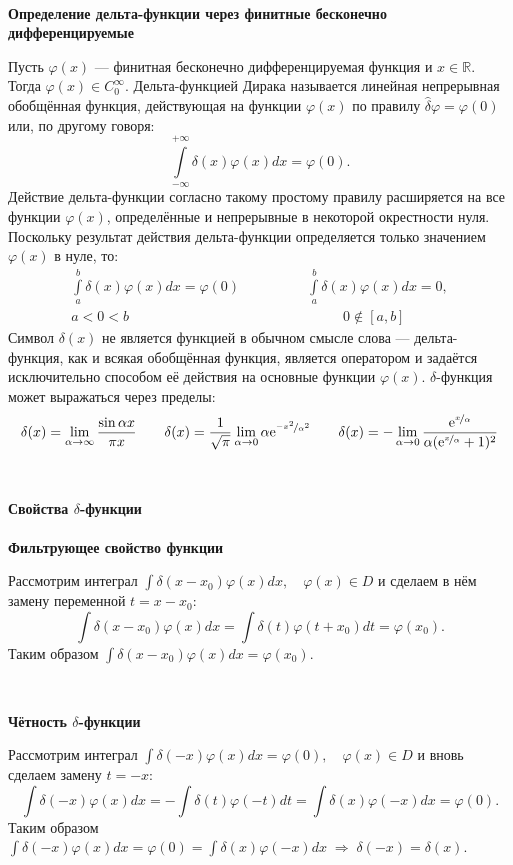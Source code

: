 \documentclass[russian,12pt]{article}
\providecommand{\subheader}[1]{
    \,
    \begin{center}
        {\large \textbf{#1}}
    \end{center}
    }
\providecommand{\headwithsub}[2]{
    \,
    \begin{center}
        {\Large \textbf{#1}} \\ \, \\
        {\large \textbf{#2}}
    \end{center}
    }
\begin{document}
\subheader{Определение дельта-функции через финитные бесконечно дифференцируемые}
Пусть $\varphi(x)$ --- финитная бесконечно дифференцируемая функция и $x \in \mathbb{R}$. Тогда $\varphi(x) \in C^{\infty}_0$. Дельта-функцией Дирака называется линейная непрерывная обобщённая функция, действующая на функции $\varphi(x)$ по правилу $\hat{\delta}\varphi = \varphi(0)$ или, по другому говоря:
$$\int\limits_{-\infty}^{+\infty}\delta(x)\varphi(x)dx = \varphi(0).$$
Действие дельта-функции согласно такому простому правилу расширяется на все функции $\varphi(x)$, определённые и непрерывные в некоторой окрестности нуля. Поскольку результат действия дельта-функции определяется только значением $\varphi(x)$ в нуле, то:
\begin{align*}
    \int\limits_{a}^{b}\delta(x)\varphi(x)dx = \varphi(0)\qquad & \qquad \int\limits_{a}^{b}\delta(x)\varphi(x)dx = 0, \\
    a<0<b\qquad\qquad\;\;                                       & \;\;\qquad\qquad0 \notin [a, b]
\end{align*}
Символ $\delta(x)$ не является функцией в обычном смысле слова --- дельта-функция, как и всякая обобщённая функция, является оператором и задаётся исключительно способом её действия на основные функции $\varphi(x)$. 
$\delta$-функция может выражаться через пределы:
$$\delta(x) = \lim_{\alpha \rightarrow \infty}\frac{\sin\alpha x}{\pi x} \qquad \delta(x) = \frac{1}{\sqrt{\pi}}\lim_{\alpha \rightarrow 0}\alpha\text{e}^{\nicefrac{-x^2}{\alpha^2}} \qquad \delta(x) = -\lim_{\alpha \rightarrow 0}\frac{\text{e}^{\nicefrac{x}{\alpha}}}{\alpha(\text{e}^{\nicefrac{x}{\alpha}} + 1)^2}$$

\headwithsub{Свойства $\delta$-функции}{Фильтрующее свойство функции}
Рассмотрим интеграл $\int\delta(x-x_0)\varphi(x)dx, \quad \varphi(x) \in D$ и сделаем в нём замену переменной $t = x - x_0$:
$$\int\delta(x-x_0)\varphi(x)dx = \int\delta(t)\varphi(t+x_0)dt = \varphi(x_0).$$
Таким образом $\int\delta(x-x_0)\varphi(x)dx = \varphi(x_0)$.

\subheader{Чётность $\delta$-функции}
Рассмотрим интеграл $\int\delta(-x)\varphi(x)dx = \varphi(0), \quad \varphi(x) \in D$ и вновь сделаем замену $t = -x$:
$$\int\delta(-x)\varphi(x)dx = - \int\delta(t)\varphi(-t)dt = \int\delta(x)\varphi(-x)dx = \varphi(0).$$
Таким образом $\int\delta(-x)\varphi(x)dx = \varphi(0) = \int\delta(x)\varphi(-x)dx \;\Rightarrow\; \delta(-x)=\delta(x)$.
\pagebreak
\end{document}
